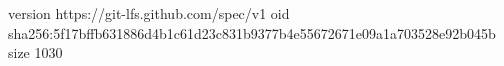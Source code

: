 version https://git-lfs.github.com/spec/v1
oid sha256:5f17bffb631886d4b1c61d23c831b9377b4e55672671e09a1a703528e92b045b
size 1030
